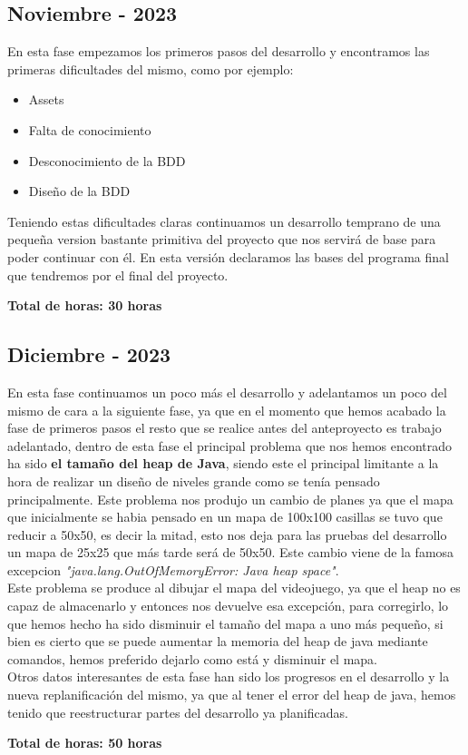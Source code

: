 \documentclass[a4paper]{article}
\begin{document}
\subsection{Noviembre - 2023}
En esta fase empezamos los primeros pasos del desarrollo y encontramos las primeras dificultades del mismo, como por ejemplo:
\begin{itemize}
    \item Assets
    \item Falta de conocimiento
    \item Desconocimiento de la BDD
    \item Diseño de la BDD
\end{itemize}
Teniendo estas dificultades claras continuamos un desarrollo temprano de una pequeña version bastante primitiva del proyecto que nos servirá de base para poder continuar con él. En esta versión declaramos las bases del programa final que tendremos por el final del proyecto.
\begin{flushright}
    \bf Total de horas: 30 horas
\end{flushright}

\clearpage
\subsection{Diciembre - 2023}
En esta fase continuamos un poco más el desarrollo y adelantamos un poco del mismo de cara a la siguiente fase, ya que en el momento que hemos acabado la fase de primeros pasos el resto que se realice antes del anteproyecto es trabajo adelantado, dentro de esta fase el principal problema que nos hemos encontrado ha sido \textbf{el tamaño del heap de Java}, siendo este el principal limitante a la hora de realizar un diseño de niveles grande como se tenía pensado principalmente. Este problema nos produjo un cambio de planes ya que el mapa que inicialmente se habia pensado en un mapa de 100x100 casillas se tuvo que reducir a 50x50, es decir la mitad, esto nos deja para las pruebas del desarrollo un mapa de 25x25 que más tarde será de 50x50. Este cambio viene de la famosa excepcion \textit{"java.lang.OutOfMemoryError: Java heap space"}.\\
Este problema se produce al dibujar el mapa del videojuego, ya que el heap no es capaz de almacenarlo y entonces nos devuelve esa excepción, para corregirlo, lo que hemos hecho ha sido disminuir el tamaño del mapa a uno más pequeño, si bien es cierto que se puede aumentar la memoria del heap de java mediante comandos, hemos preferido dejarlo como está y disminuir el mapa.\\
Otros datos interesantes de esta fase han sido los progresos en el desarrollo y la nueva replanificación del mismo, ya que al tener el error del heap de java, hemos tenido que reestructurar partes del desarrollo ya planificadas.
\begin{flushright}
    \bf Total de horas: 50 horas
\end{flushright}
\end{document}
